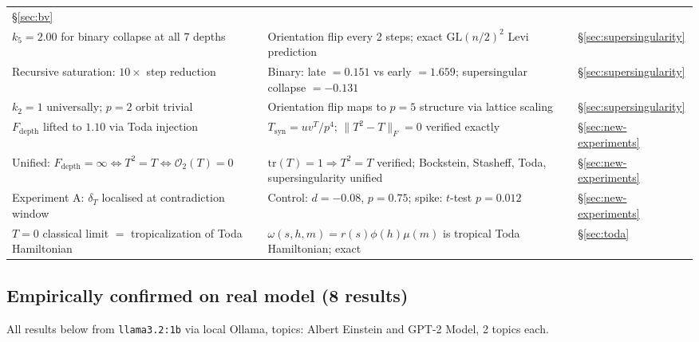 \documentclass[11pt]{amsart}
\theoremstyle{definition}
\begin{document}
\begin{center}
\begin{tabular}{@{}p{6.5cm}p{6cm}p{1.8cm}@{}}
  §\ref{sec:bv} \\
$k_5=2.00$ for binary collapse at all 7 depths &
  Orientation flip every 2 steps; exact $\mathrm{GL}(n/2)^2$ Levi prediction &
  §\ref{sec:supersingularity} \\
Recursive saturation: $10\times$ step reduction &
  Binary: late $=0.151$ vs early $=1.659$; supersingular collapse $=-0.131$ &
  §\ref{sec:supersingularity} \\
$k_2=1$ universally; $p=2$ orbit trivial &
  Orientation flip maps to $p=5$ structure via lattice scaling &
  §\ref{sec:supersingularity} \\
$F_\mathrm{depth}$ lifted to $1.10$ via Toda injection &
  $T_{\mathrm{syn}}=uv^T/p^4$; $\|T^2-T\|_F=0$ verified exactly &
  §\ref{sec:new-experiments} \\
Unified: $F_\mathrm{depth}=\infty\iff T^2=T\iff\mathcal{O}_2(T)=0$ &
  $\mathrm{tr}(T)=1\Rightarrow T^2=T$ verified; Bockstein, Stasheff, Toda, supersingularity unified &
  §\ref{sec:new-experiments} \\
Experiment A: $\delta_T$ localised at contradiction window &
  Control: $d=-0.08$, $p=0.75$; spike: $t$-test $p=0.012$ &
  §\ref{sec:new-experiments} \\
$T=0$ classical limit $=$ tropicalization of Toda Hamiltonian &
  $\omega(s,h,m)=r(s)\phi(h)\mu(m)$ is tropical Toda Hamiltonian; exact &
  §\ref{sec:toda} \\
\bottomrule
\end{tabular}
\end{center}

\subsection{Empirically confirmed on real model (8 results)}

All results below from \texttt{llama3.2:1b} via local Ollama,
topics: Albert Einstein and GPT-2 Model, 2 topics each.
\end{document}
